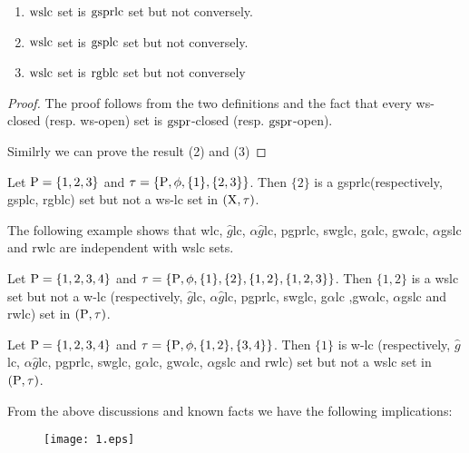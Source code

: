 \begin{thm}\label{thm6.2.18}
\begin{enumerate}[(1)]
\item $\mathrm{wslc}$ set is $\mathrm{gsprlc}$ set but not conversely.
\item $\mathrm{wslc}$ set is $\mathrm{gsplc}$ set but not conversely.
\item $\mathrm{wslc}$ set is $\mathrm{rgblc}$ set but not conversely
\end{enumerate}
\end{thm}

\begin{proof}
The proof follows from the two definitions and the fact that every ws-closed (resp. ws-open) set is $\mathrm{gspr}$-closed (resp. $\mathrm{gspr}$-open).

Similrly we can prove the result (2) and (3)
\end{proof}

\begin{exm}\label{exam6.2.19}
Let $\mathrm{P}= \{1,2, 3\}$ and $\tau=\{\mathrm{P}, \phi, \{1\}, \{2,3\}\}$. Then $\{2\}$ is a gsprlc(respectively, gsplc, rgblc) set but not a ws-lc set in $(\mathrm{X}, \tau)$.
\end{exm}

\begin{rem}\label{rem6.2.20}
The following example shows that wlc, $\hat{g}$lc, $\alpha\hat{g}$lc, pgprlc, swglc, g$\alpha$lc, gw$\alpha$lc, $\alpha$gslc and rwlc are independent with wslc sets.
\end{rem}

\begin{exm}\label{exam6.2.21}
Let $\mathrm{P}= \{1, 2, 3, 4\}$ and $\tau=\{\mathrm{P}, \phi, \{1\}, \{2\}, \{1, 2\}, \{1, 2, 3\}\}$. Then $\{1, 2\}$ is a wslc set but not a w-lc (respectively, $\hat{g}$lc, $\alpha\hat{g}$lc, pgprlc, swglc, g$\alpha$lc ,gw$\alpha$lc, $\alpha$gslc and rwlc) set in $(\mathrm{P}, \tau)$.
\end{exm}

\begin{exm}\label{exam6.2.22}
Let $\mathrm{P}= \{1,2,3, 4\}$ and $\tau=\{\mathrm{P}, \phi, \{1, 2\}, \{3,4\}\}$. Then $\{1\}$ is w-lc (respectively, $\hat{g}$lc, $\alpha\hat{g}$lc, pgprlc, swglc, g$\alpha$lc, gw$\alpha$lc, $\alpha$gslc and rwlc) set but not a wslc set in $(\mathrm{P}, \tau)$.
\end{exm}

\begin{rem}\label{rem6.2.23}
From the above discussions and known facts we have the following implications:
\begin{figure}[H]
\centering
\texttt{[image: 1.eps]}
\end{figure}
\end{rem}


